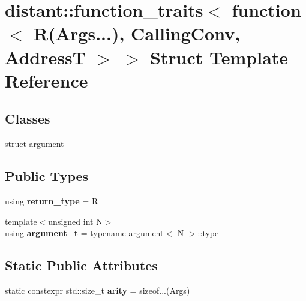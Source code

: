 \hypertarget{structdistant_1_1function__traits_3_01function_3_01_r_07_args_8_8_8_08_00_01_calling_conv_00_01_address_t_01_4_01_4}{}\section{distant\+:\+:function\+\_\+traits$<$ function$<$ R(Args...), Calling\+Conv, AddressT $>$ $>$ Struct Template Reference}
\label{structdistant_1_1function__traits_3_01function_3_01_r_07_args_8_8_8_08_00_01_calling_conv_00_01_address_t_01_4_01_4}
\subsection*{Classes}
\begin{DoxyCompactItemize}
\item 
struct \mbox{\hyperlink{structdistant_1_1function__traits_3_01function_3_01_r_07_args_8_8_8_08_00_01_calling_conv_00_01_address_t_01_4_01_4_1_1argument}{argument}}
\end{DoxyCompactItemize}
\subsection*{Public Types}
\begin{DoxyCompactItemize}
\item 
\mbox{\label{structdistant_1_1function__traits_3_01function_3_01_r_07_args_8_8_8_08_00_01_calling_conv_00_01_address_t_01_4_01_4_a9cf34c74c3f6646f85274e0c5a23a505}} 
using {\bfseries return\+\_\+type} = R
\item 
\mbox{\label{structdistant_1_1function__traits_3_01function_3_01_r_07_args_8_8_8_08_00_01_calling_conv_00_01_address_t_01_4_01_4_a89d90414bcba6d493ef77f618e418aa5}} 
{\footnotesize template$<$unsigned int N$>$ }\\using {\bfseries argument\+\_\+t} = typename argument$<$ N $>$\+::type
\end{DoxyCompactItemize}
\subsection*{Static Public Attributes}
\begin{DoxyCompactItemize}
\item 
\mbox{\label{structdistant_1_1function__traits_3_01function_3_01_r_07_args_8_8_8_08_00_01_calling_conv_00_01_address_t_01_4_01_4_a27160e4e8828b01f03753094e132a1fd}} 
static constexpr std\+::size\+\_\+t {\bfseries arity} = sizeof...(Args)
\end{DoxyCompactItemize}


